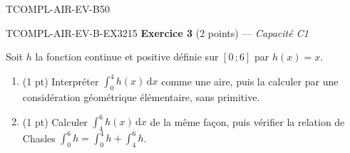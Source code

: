 \begin{evaluation}{TCOMPL-AIR-EV-B}{50}
\begin{exercice}{TCOMPL-AIR-EV-B-EX3}{2}{15}
\textbf{Exercice 3} (2 points) --- \textit{Capacité C1}

\medskip

Soit $h$ la fonction continue et positive définie sur $[0\,;6]$ par $h(x)=x$.
\begin{enumerate}
  \item (1 pt) Interpréter $\displaystyle\int_0^4 h(x)\,\mathrm{d}x$ comme une aire, puis la calculer par une considération géométrique élémentaire, sans primitive.
  \item (1 pt) Calculer $\displaystyle\int_4^6 h(x)\,\mathrm{d}x$ de la même façon, puis vérifier la relation de Chasles
  $\displaystyle\int_0^6 h = \int_0^4 h + \int_4^6 h$.
\end{enumerate}
\end{exercice}

\end{evaluation}
